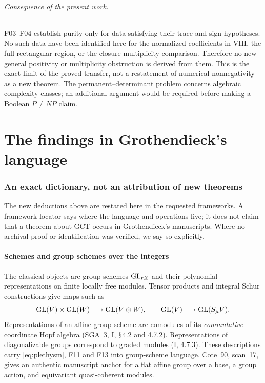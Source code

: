 \documentclass[11pt,a4paper]{article}
\renewcommand{\S}{\ensuremath{\mathsection}}
\newcommand{\fid}[1]{\textsf{#1}}\newcommand{\gate}[1]{\textsf{#1}}
\theoremstyle{named}\newtheorem{finding}{Finding}[section]
\theoremstyle{definition}\newtheorem{definition}[finding]{Definition}
\theoremstyle{remark}\newtheorem{remark}[finding]{Remark}
\begin{document}
\paragraph{Consequence of the present work.}
\fid{F03}--\fid{F04} establish purity only for data satisfying their trace and sign hypotheses. No such data have been identified here for the normalized coefficients in VIII, the full rectangular region, or the closure multiplicity comparison. Therefore no new general positivity or multiplicity obstruction is derived from them. This is the exact limit of the proved transfer, not a restatement of numerical nonnegativity as a new theorem. The permanent--determinant problem concerns algebraic complexity classes; an additional argument would be required before making a Boolean $P\ne NP$ claim.

\part{The findings in Grothendieck's language}
\section{An exact dictionary, not an attribution of new theorems}\label{sec:groth}
The new deductions above are restated here in the requested frameworks. A framework locator says where the language and operations live; it does not claim that a theorem about GCT occurs in Grothendieck's manuscripts. Where no archival proof or identification was verified, we say so explicitly.

\subsection{Schemes and group schemes over the integers}
The classical objects are group schemes $\mathrm{GL}_{r,\mathbb Z}$ and their polynomial representations on finite locally free modules. Tensor products and integral Schur constructions give maps such as
\[
 \mathrm{GL}(V)\times\mathrm{GL}(W)\longrightarrow\mathrm{GL}(V\otimes W),\qquad
 \mathrm{GL}(V)\longrightarrow\mathrm{GL}(S_\mu V).
\]
Representations of an affine group scheme are comodules of its \emph{commutative} coordinate Hopf algebra (SGA~3, I, \S4.2 and 4.7.2). Representations of diagonalizable groups correspond to graded modules (I, 4.7.3). These descriptions carry \eqref{eq:plethysm}, \fid{F11} and \fid{F13} into group-scheme language. Cote~90, scan~17, gives an authentic manuscript anchor for a flat affine group over a base, a group action, and equivariant quasi-coherent modules.
\end{document}

